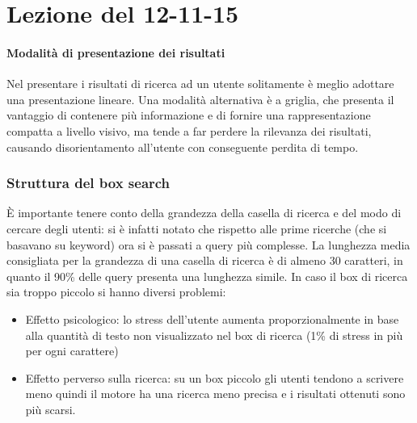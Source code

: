 \section{Lezione del 12-11-15}


\paragraph*{Modalit\`a di presentazione dei risultati}Nel presentare i risultati di ricerca ad un utente solitamente \`e meglio adottare una presentazione lineare. Una modalit\`a alternativa \`e a griglia, che presenta il vantaggio di contenere pi\`u informazione e di fornire una rappresentazione compatta a livello visivo, ma tende a far perdere la rilevanza dei risultati, causando disorientamento all'utente con conseguente perdita di tempo.

\subsubsection{Struttura del box search}\`E importante tenere conto della grandezza della casella di ricerca e del modo di cercare degli utenti: si \`e infatti notato che rispetto alle prime ricerche (che si basavano su keyword) ora si \`e passati a query pi\`u complesse. La lunghezza media consigliata per la grandezza di una casella di ricerca \`e di almeno 30 caratteri, in quanto il 90\% delle query presenta una lunghezza simile. In caso il box di ricerca sia troppo piccolo si hanno diversi problemi:
\begin{itemize}

\item Effetto psicologico: lo stress dell'utente aumenta proporzionalmente in base alla quantit\`a di testo non visualizzato nel box di ricerca (1\% di stress in pi\`u per ogni carattere)

\item Effetto perverso sulla ricerca: su un box piccolo gli utenti tendono a scrivere meno quindi il motore ha una ricerca meno precisa e i risultati ottenuti sono pi\`u scarsi.

\end{itemize}


